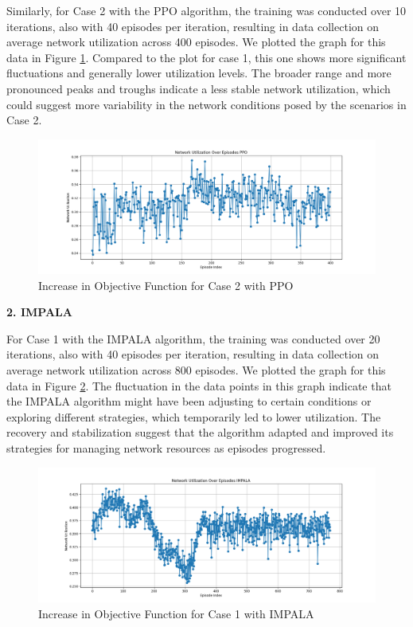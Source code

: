 \documentclass[conference]{IEEEtran}
\begin{document}
Similarly, for Case 2 with the PPO algorithm, the training was conducted over 10 iterations, also with 40 episodes per iteration, resulting in data collection on average network utilization across 400 episodes. We plotted the graph for this data in Figure \ref{fig:obj_c2_ppo}. Compared to the plot for case 1, this one shows more significant fluctuations and generally lower utilization levels. The broader range and more pronounced peaks and troughs indicate a less stable network utilization, which could suggest more variability in the network conditions posed by the scenarios in Case 2.


\begin{figure}[htp]
    \centering
    \includegraphics[width=\columnwidth]{images/obj_fn_case2_PPO.png}
    \caption{Increase in Objective Function for Case 2 with PPO}
    \label{fig:obj_c2_ppo}
\end{figure}

\textbf{2. IMPALA}

For Case 1 with the IMPALA algorithm, the training was conducted over 20 iterations, also with 40 episodes per iteration, resulting in data collection on average network utilization across 800 episodes. We plotted the graph for this data in Figure \ref{fig:obj_c1_impala}. The fluctuation in the data points in this graph indicate that the IMPALA algorithm might have been adjusting to certain conditions or exploring different strategies, which temporarily led to lower utilization. The recovery and stabilization suggest that the algorithm adapted and improved its strategies for managing network resources as episodes progressed.

\begin{figure}[htp]
    \centering
    \includegraphics[width=\columnwidth]{images/obj_fn_case1_impala.png}
    \caption{Increase in Objective Function for Case 1 with IMPALA}
    \label{fig:obj_c1_impala}
\end{figure}
\end{document}
